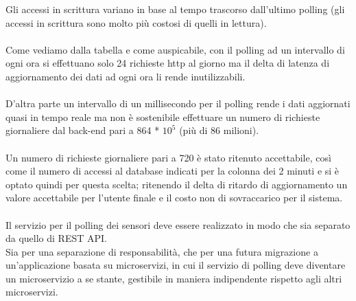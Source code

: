Gli accessi in scrittura variano in base al tempo trascorso dall'ultimo polling (gli accessi in scrittura sono molto
più costosi di quelli in lettura).
\\\\
Come vediamo dalla tabella e come auspicabile, con il polling ad un intervallo di ogni ora si effettuano solo
24 richieste http al giorno ma il delta di latenza di aggiornamento dei dati ad ogni ora li rende inutilizzabili.
\\\\
D'altra parte un intervallo di un millisecondo per il polling rende i dati aggiornati quasi in tempo reale ma 
non è sostenibile effettuare un numero di richieste giornaliere dal back-end pari a 864 * $10^5$ (più di 86 milioni).
\leavevmode
\\\\
Un numero di richieste giornaliere pari a 720 è stato ritenuto accettabile, così come il numero di accessi al database
indicati per la colonna dei 2 minuti e si è optato quindi per questa scelta; ritenendo il delta di ritardo di
aggiornamento un valore accettabile per l'utente finale e il costo non di sovraccarico per il sistema.
\\\\
Il servizio per il polling dei sensori deve essere realizzato in modo che sia separato da quello di REST API.
\\
Sia per una separazione di responsabilità, che per una futura migrazione a un'applicazione basata su microservizi,
in cui il servizio di polling deve diventare un microservizio a se stante, gestibile in maniera indipendente rispetto
agli altri microservizi.

